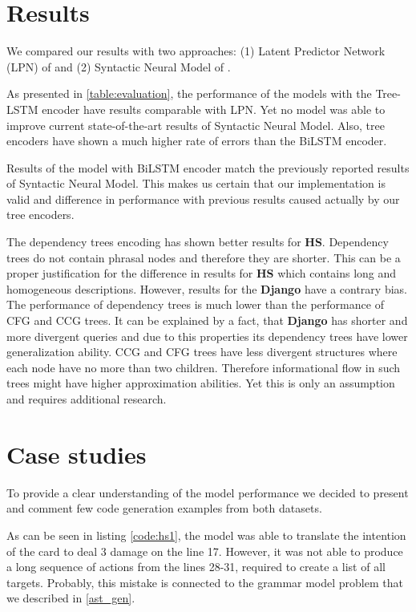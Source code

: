 \section{Results}
We compared our results with two approaches: (1) Latent Predictor Network (LPN) of \cite{Ling2016} and (2) Syntactic Neural Model of \cite{Yin2017}. 

As presented in \cref{table:evaluation}, the performance of the models with the Tree-LSTM encoder have results comparable with LPN. Yet no model was able to improve current state-of-the-art results of Syntactic Neural Model. Also, tree encoders have shown a much higher rate of errors than the BiLSTM encoder.

Results of the model with BiLSTM encoder match the previously reported results of Syntactic Neural Model. This makes us certain that our implementation is valid and difference in performance with previous results caused actually by our tree encoders.

The dependency trees encoding has shown better results for \textbf{HS}. Dependency trees do not contain phrasal nodes and therefore they are shorter. This can be a proper justification for the difference in results for \textbf{HS} which contains long and homogeneous descriptions. However, results for the \textbf{Django} have a contrary bias. The performance of dependency trees is much lower than the performance of CFG and CCG trees. It can be explained by a fact, that \textbf{Django} has shorter and more divergent queries and due to this properties its dependency trees have lower generalization ability. CCG and CFG trees have less divergent structures where each node have no more than two children. Therefore informational flow in such trees might have higher approximation abilities. Yet this is only an assumption and requires additional research.

\section{Case studies}

To provide a clear understanding of the model performance we decided to present and comment  few code generation examples from both datasets.

As can be seen in listing \ref{code:hs1}, the model was able to translate the intention of the card to deal 3 damage on the line 17. However, it was not able to produce a long sequence of actions from the lines 28-31, required to create a list of all targets. Probably, this mistake is connected to the grammar model problem that we described in \cref{ast_gen}.

